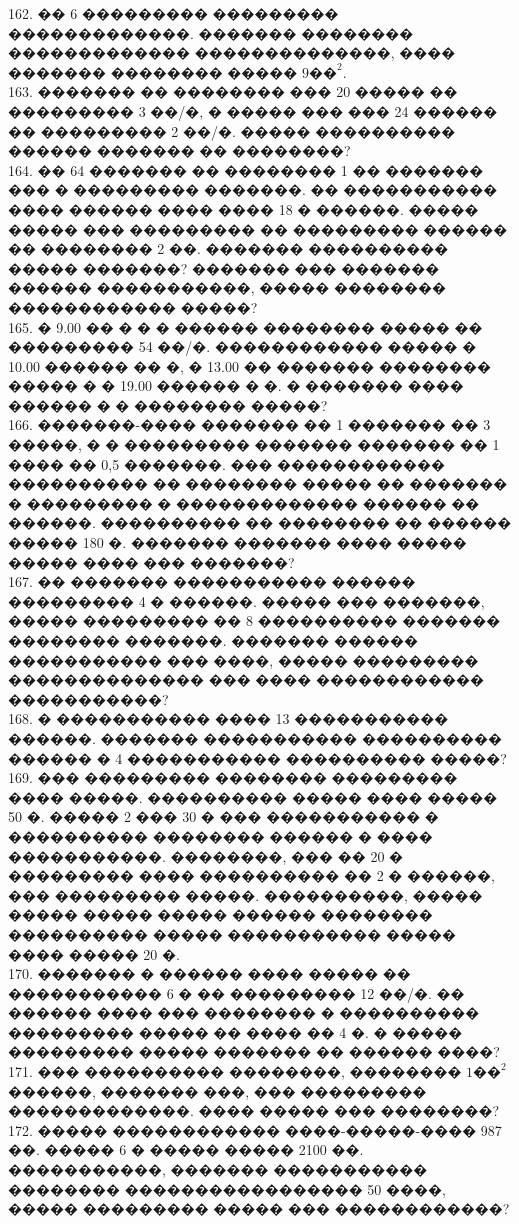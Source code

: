 \documentclass[12pt]{article}
\begin{document}
162. �� 6 ��������� ��������� �������������. ������� �������� ������������� ��������������, ���� ������� �������� ����� $9\text{��}^2.$\\
163. ������� �� �������� ��� 20 ����� �� ��������� 3 ��/�, � ����� ��� ��� 24 ������ �� ��������� 2 ��/�. ����� ���������� ������ ������� �� ��������?\\
164. �� 64 ������� �� �������� 1 �� ������� ��� � ��������� �������. �� ����������� ���� ������ ���� ���� 18 � ������. ����� ����� ��� ��������� �� ��������� ������ �� �������� 2 ��. ������� ���������� ����� �������? ������� ��� ������� ������ �����������, ����� �������� ������������ �����?\\
165. � 9.00 �� � � � ������ �������� ����� �� ��������� 54 ��/�. ������������ ����� � 10.00 ������ �� �, � 13.00 �� ������� �������� ����� � � 19.00 ������ � �. � ������� ���� ������ � � �������� �����?\\
166. �������-���� ������� �� 1 ������� �� 3 �����, � � ��������� ������� ������� �� 1 ���� �� 0,5 �������. ��� ������������ ���������� �� �������� ����� �� ������� � ��������� � ������������� ������ �� ������. ���������� �� �������� �� ������ ����� 180 �. ������� ������� ���� ����� ����� ���� ��� �������?\\
167. �� ������� ����������� ������ ��������� 4 � ������. ����� ��� �������, ����� ��������� �� 8 ���������� ������� �������� �������. ������� ������ ����������� ��� ����, ����� ��������� �������������� ��� ���� ������������ �����������?\\
168. � ����������� ���� 13 ����������� ������. ������� ����������� ���������� ������ � 4 ����������� ���������� �����?\\
169. ��� ��������� �������� ��������� ���� �����. ���������� ����� ���� ����� 50 �. ����� 2 ��� 30 � ��� ����������� � ���������� �������� ������ � ���� �����������. ��������, ��� �� 20 � ��������� ���� ���������� �� 2 � ������, ��� ��������� �����. ����������, ����� ����� ����� ����� ������ �������� ���������� ����� ����������� ����� ���� ����� 20 �.\\
170. ������� � ������ ���� ����� �� ����������� 6 � �� ��������� 12 ��/�. �� ������ ���� ��� �������� � ���������� ��������� ����� �� ���� �� 4 �. � ����� ��������� ����� ������� �� ������ ����?\\
171. ��� ���������� ��������, �������� $1\text{��}^2$ ������, ������� ���, ��� ��������� �������������. ���� ����� ��� ��������?\\
172. ����� ������������ ����-�����-���� 987 ��. ����� 6 � ����� ����� 2100 ��. �����������, ������� ����������� �������� ����������������� 50 ����, ����� ��������� ����� ��� ������������?\\
\end{document}
